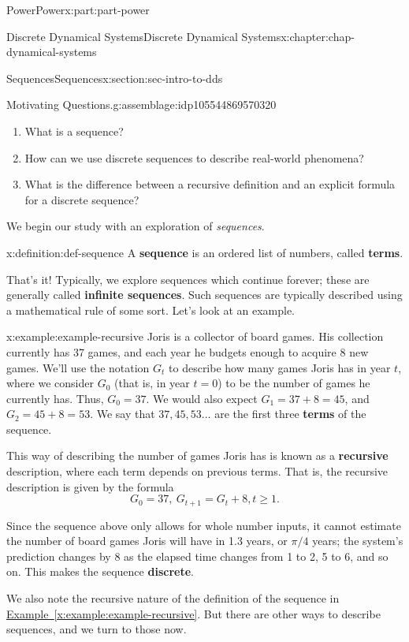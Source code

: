 \documentclass[oneside,10pt,]{book}
\newcommand{\xreffont}{\relax}
\newcommand{\terminology}[1]{\textbf{#1}}
\numberwithin{equation}{section}
\renewcommand{\ge}{\geqslant}
\begin{document}
\begin{partptx}{Power}{}{Power}{}{}{x:part:part-power}
\begin{chapterptx}{Discrete Dynamical Systems}{}{Discrete Dynamical Systems}{}{}{x:chapter:chap-dynamical-systems}
\begin{sectionptx}{Sequences}{}{Sequences}{}{}{x:section:sec-intro-to-dds}
\begin{assemblage}{Motivating Questions.}{g:assemblage:idp105544869570320}
\begin{enumerate}
\item{}What is a sequence?%
\item{}How can we use discrete sequences to describe real-world phenomena?%
\item{}What is the difference between a recursive definition and an explicit formula for a discrete sequence?%
\end{enumerate}
%
\end{assemblage}
We begin our study with an exploration of \emph{sequences}.%
\begin{definition}{}{x:definition:def-sequence}%
%
%
A \terminology{sequence} is an ordered list of numbers, called \terminology{terms}.%
\end{definition}
That's it! Typically, we explore sequences which continue forever; these are generally called \terminology{infinite sequences}. Such sequences are typically described using a mathematical rule of some sort. Let's look at an example.%
\begin{example}{}{x:example:example-recursive}%
Joris is a collector of board games. His collection currently has 37 games, and each year he budgets enough to acquire 8 new games. We'll use the notation \(G_t\) to describe how many games Joris has in year \(t\), where we consider \(G_0\) (that is, in year \(t=0\)) to be the number of games he currently has. Thus, \(G_0 = 37\). We would also expect \(G_1 = 37 + 8 = 45\), and \(G_2 = 45 + 8 = 53\). We say that \(37, 45, 53\ldots\) are the first three \terminology{terms} of the sequence.%
\par
This way of describing the number of games Joris has is known as a \terminology{recursive} description, where each term depends on previous terms. That is, the recursive description is given by the formula%
\begin{equation}
G_0 = 37, \ G_{t+1} = G_t + 8, t \ge 1.\label{x:men:eq-recursive-games}
\end{equation}
%
\end{example}
Since the sequence above only allows for whole number inputs, it cannot estimate the number of board games Joris will have in 1.3 years, or \(\pi/4\) years; the system's prediction changes by 8 as the elapsed time changes from 1 to 2, 5 to 6, and so on. This makes the sequence \terminology{discrete}.%
\par
We also note the recursive nature of the definition of the sequence in \hyperref[x:example:example-recursive]{Example~{\xreffont\ref{x:example:example-recursive}}}. But there are other ways to describe sequences, and we turn to those now.%

\end{sectionptx}
\end{chapterptx}
\end{partptx}
\end{document}
